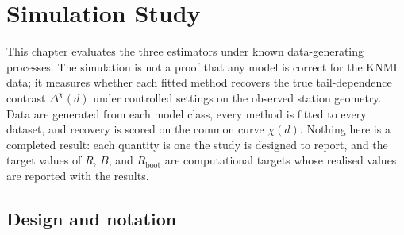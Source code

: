 %
%
%
%
%
\section{Simulation Study}\label{sec:simulation}

This chapter evaluates the three estimators under known data-generating processes. The simulation is not a proof that any model is correct for the KNMI data; it measures whether each fitted method recovers the true tail-dependence contrast \(\Delta^{\chi}(d)\) under controlled settings on the observed station geometry. Data are generated from each model class, every method is fitted to every dataset, and recovery is scored on the common curve \(\chi(d)\). Nothing here is a completed result: each quantity is one the study is designed to report, and the target values of \(R\), \(B\), and \(R_{\mathrm{boot}}\) are computational targets whose realised values are reported with the results.

\subsection{Design and notation}\label{sec:sim-design}

